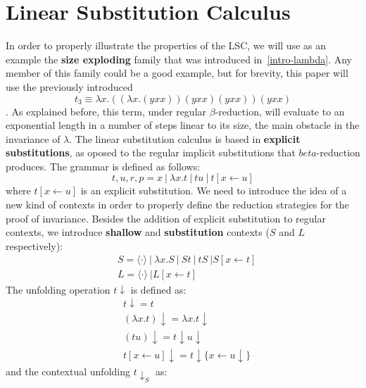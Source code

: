 \documentclass[11pt]{article}
\begin{document}
\section{Linear Substitution Calculus}
In order to properly illustrate the properties of the LSC, we will use as an example the \textbf{size exploding} family that was introduced in~\ref{intro-lambda}. Any member of this family could be a good example, but for brevity, this paper will use the previously introduced 
\begin{equation}
	t_{3} \equiv \lambda x.((\lambda x. (yxx))(yxx)(yxx))(yxx)
\end{equation}. 
As explained before, this term, under regular $\beta$-reduction, will evaluate to an exponential length in a number of steps linear to its size, the main obstacle in the invariance of $\lambda$.
The linear substitution calculus is based in \textbf{explicit substitutions}, as oposed to the regular implicit substitutions that $beta$-reduction produces. The grammar is defined as follows:
\begin{equation}
  t, u, r, p = x \ | \ \lambda x.t \ | \ tu \ | \ t[x \leftarrow u]
\end{equation}
where $t[x \leftarrow u]$ is an explicit substitution.
We need to introduce the idea of a new kind of contexts in order to properly define the reduction strategies for the proof of invariance. Besides the addition of explicit substitution to regular contexts, we introduce \textbf{shallow} and \textbf{substitution} contexts ($S$ and $L$ respectively):
\begin{equation}
  \begin{split}
    &S = \langle \cdot \rangle \ | \ \lambda x.S \ | \ St \ | \ tS \ | S[x \leftarrow t] \\
    &L = \langle \cdot \rangle \ | L[x \leftarrow t]
  \end{split}
\end{equation}
The unfolding operation $t\downarrow$ is defined as:
\begin{equation}
  \begin{split}
    &t\downarrow = t \\
    &(\lambda x .t)\downarrow = \lambda x.t\downarrow \\
    &(tu)\downarrow = t\downarrow u \downarrow \\
    &t[x \leftarrow u]\downarrow = t\downarrow \{x \leftarrow u \downarrow \}
  \end{split}
\end{equation}
and the contextual unfolding $t\downarrow_S$ as:
\end{document}
